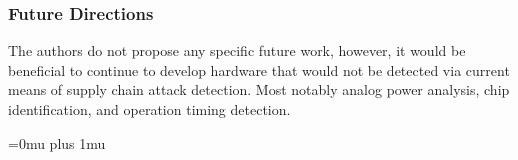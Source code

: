 \subsubsection{Future Directions}

\noindent
The authors do not propose any specific future work, however, it would be beneficial to continue to develop hardware that would not be detected via current means of supply chain attack detection.  Most notably analog power analysis, chip identification, and operation timing detection.

\Urlmuskip=0mu plus 1mu\relax
\pagebreak
